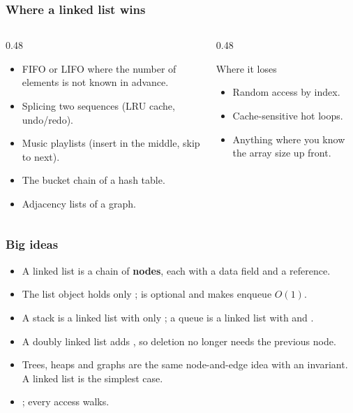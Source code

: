 \documentclass[aspectratio=169,10pt,compress]{beamer}
\begin{document}
\begin{frame}[t,fragile] \frametitle{Where a linked list wins}
  \begin{columns}[T]
    \begin{column}{0.48\textwidth}
      \begin{itemize}\small
        \item FIFO or LIFO where the number of elements is not known
              in advance.
        \item Splicing two sequences (LRU cache, undo/redo).
        \item Music playlists (insert in the middle, skip to next).
        \item The bucket chain of a hash table.
        \item Adjacency lists of a graph.
      \end{itemize}
    \end{column}
    \begin{column}{0.48\textwidth}
      \begin{block}{Where it loses}
        \small
        \begin{itemize}
          \item Random access by index.
          \item Cache-sensitive hot loops.
          \item Anything where you know the array size up front.
        \end{itemize}
      \end{block}
    \end{column}
  \end{columns}
\end{frame}




\begin{frame}[t,fragile] \frametitle{Big ideas}
  \begin{itemize}
    \item A linked list is a chain of \textbf{nodes}, each with a data
          field and a  reference.
    \item The list object holds only ;  is
          optional and makes enqueue $O(1)$.
    \item A stack is a linked list with only ; a queue is a
          linked list with  and .
    \item A doubly linked list adds , so deletion no
          longer needs the previous node.
    \item Trees, heaps and graphs are the same node-and-edge idea with
          an invariant. A linked list is the simplest case.
    \item {}; every access walks.
  \end{itemize}
\end{frame}
\end{document}
